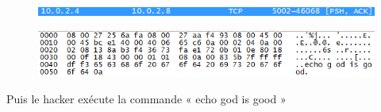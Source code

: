 \documentclass[11pt]{article}
\begin{document}
\begin{figure}[h!]
        \centering \includegraphics[scale=0.9]{Exo3/19.png}
        \caption{}
         \label{fig:19}
\end{figure}

\begin{figure}[h!]
        \centering \includegraphics[scale=0.9]{Exo3/20.png}
        \caption{}
         \label{fig:20}
\end{figure}

Puis le hacker exécute la commande « echo god is good » 


\newpage
\listoffigures
\end{document}
